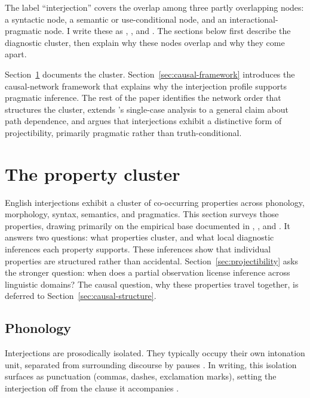\documentclass[12pt]{article}
\begin{document}
The label \enquote{interjection} covers the overlap among
three partly overlapping nodes: a syntactic node, a semantic or
use-conditional node, and an interactional-pragmatic node. I write these
as ,
, and
. The sections below first
describe the diagnostic cluster, then explain why these nodes overlap
and why they come apart.

Section~\ref{sec:cluster} documents the cluster.
Section~\ref{sec:causal-framework} introduces the causal-network
framework that explains why the interjection profile supports pragmatic
inference. The rest of the paper identifies the network order that
structures the cluster, extends \textcite{gehweiler2008}'s single-case
analysis to a general claim about path dependence, and argues that
interjections exhibit a distinctive form of projectibility, primarily
pragmatic rather than truth-conditional.

\section{The property cluster}\label{sec:cluster}

English interjections exhibit a cluster of co-occurring properties across
phonology, morphology, syntax, semantics, and pragmatics. This section
surveys those properties, drawing primarily on the empirical base documented
in \textcite{ameka1992}, \textcite{quirk1985}, and
\textcite{HuddlestonPullum2002}. It answers two questions: what
properties cluster, and what local diagnostic inferences each property
supports. These inferences show that individual properties are
structured rather than accidental. Section~\ref{sec:projectibility} asks
the stronger question: when does a partial observation license inference
across linguistic domains? The causal question, why these properties
travel together, is deferred to Section~\ref{sec:causal-structure}.

\subsection{Phonology}

Interjections are prosodically isolated. They typically occupy their own
intonation unit, separated from surrounding discourse by pauses
\citep[108]{ameka1992}. In writing, this isolation surfaces as punctuation
(commas, dashes, exclamation marks), setting the interjection off from the
clause it accompanies \citep[1350]{HuddlestonPullum2002}.
\end{document}
